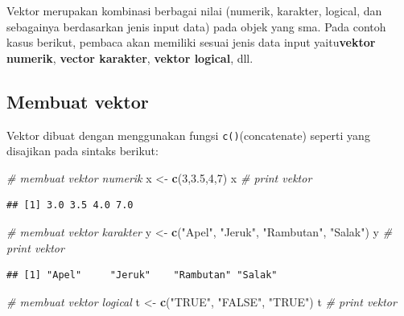 \documentclass[
]{book}
\newenvironment{Shaded}{\begin{snugshade}}{\end{snugshade}}
\newcommand{\CommentTok}[1]{\textcolor[rgb]{0.56,0.35,0.01}{\textit{#1}}}
\newcommand{\DecValTok}[1]{\textcolor[rgb]{0.00,0.00,0.81}{#1}}
\newcommand{\FloatTok}[1]{\textcolor[rgb]{0.00,0.00,0.81}{#1}}
\newcommand{\FunctionTok}[1]{\textcolor[rgb]{0.13,0.29,0.53}{\textbf{#1}}}
\newcommand{\NormalTok}[1]{#1}
\newcommand{\OtherTok}[1]{\textcolor[rgb]{0.56,0.35,0.01}{#1}}
\newcommand{\StringTok}[1]{\textcolor[rgb]{0.31,0.60,0.02}{#1}}
\theoremstyle{definition}
\theoremstyle{definition}
\theoremstyle{definition}
\theoremstyle{definition}
\theoremstyle{remark}
\begin{document}
Vektor merupakan kombinasi berbagai nilai (numerik, karakter, logical, dan sebagainya berdasarkan jenis input data) pada objek yang sma. Pada contoh kasus berikut, pembaca akan memiliki sesuai jenis data input yaitu\textbf{vektor numerik}, \textbf{vector karakter}, \textbf{vektor logical}, dll.

\hypertarget{createvector}{%
\subsection{Membuat vektor}\label{createvector}}

Vektor dibuat dengan menggunakan fungsi \texttt{c()}(concatenate) seperti yang disajikan pada sintaks berikut:

\begin{Shaded}
\begin{Highlighting}[]
\CommentTok{\# membuat vektor numerik}
\NormalTok{x }\OtherTok{\textless{}{-}} \FunctionTok{c}\NormalTok{(}\DecValTok{3}\NormalTok{,}\FloatTok{3.5}\NormalTok{,}\DecValTok{4}\NormalTok{,}\DecValTok{7}\NormalTok{)}
\NormalTok{x }\CommentTok{\# print vektor}
\end{Highlighting}
\end{Shaded}

\begin{verbatim}
## [1] 3.0 3.5 4.0 7.0
\end{verbatim}

\begin{Shaded}
\begin{Highlighting}[]
\CommentTok{\# membuat vektor karakter}
\NormalTok{y }\OtherTok{\textless{}{-}} \FunctionTok{c}\NormalTok{(}\StringTok{"Apel"}\NormalTok{, }\StringTok{"Jeruk"}\NormalTok{, }\StringTok{"Rambutan"}\NormalTok{, }\StringTok{"Salak"}\NormalTok{)}
\NormalTok{y }\CommentTok{\# print vektor}
\end{Highlighting}
\end{Shaded}

\begin{verbatim}
## [1] "Apel"     "Jeruk"    "Rambutan" "Salak"
\end{verbatim}

\begin{Shaded}
\begin{Highlighting}[]
\CommentTok{\# membuat vektor logical}
\NormalTok{t }\OtherTok{\textless{}{-}} \FunctionTok{c}\NormalTok{(}\StringTok{"TRUE"}\NormalTok{, }\StringTok{"FALSE"}\NormalTok{, }\StringTok{"TRUE"}\NormalTok{)}
\NormalTok{t }\CommentTok{\# print vektor}
\end{Highlighting}
\end{Shaded}
\end{document}
